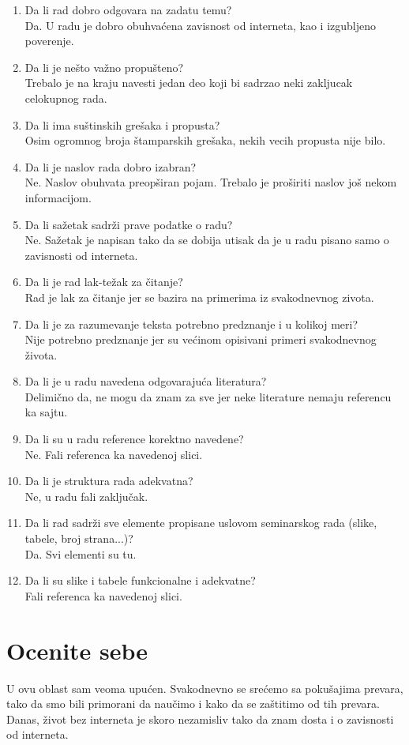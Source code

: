 \documentclass[a4paper]{report}
\begin{document}
\begin{enumerate}
\item Da li rad dobro odgovara na zadatu temu?\\
Da. U radu je dobro obuhvaćena zavisnost od interneta, kao i izgubljeno poverenje.
\item Da li je nešto važno propušteno?\\
Trebalo je na kraju navesti jedan deo koji bi sadrzao neki zakljucak celokupnog rada.
\item Da li ima suštinskih grešaka i propusta?\\
Osim ogromnog broja štamparskih grešaka, nekih vecih propusta nije bilo.
\item Da li je naslov rada dobro izabran?\\
Ne. Naslov obuhvata preopširan pojam. Trebalo je proširiti naslov još nekom informacijom. 
\item Da li sažetak sadrži prave podatke o radu?\\
Ne. Sažetak je napisan tako da se dobija utisak da je u radu pisano samo o zavisnosti od interneta.
\item Da li je rad lak-težak za čitanje?\\
Rad je lak za čitanje jer se bazira na primerima iz svakodnevnog zivota.
\item Da li je za razumevanje teksta potrebno predznanje i u kolikoj meri?\\
Nije potrebno predznanje jer su većinom opisivani primeri svakodnevnog života.
\item Da li je u radu navedena odgovarajuća literatura?\\
Delimično da, ne mogu da znam za sve jer neke literature nemaju referencu ka sajtu.
\item Da li su u radu reference korektno navedene?\\
Ne. Fali referenca ka navedenoj slici.
\item Da li je struktura rada adekvatna?\\
Ne, u radu fali zaključak.
\item Da li rad sadrži sve elemente propisane uslovom seminarskog rada (slike, tabele, broj strana...)?\\
Da. Svi elementi su tu.
\item Da li su slike i tabele funkcionalne i adekvatne?\\
Fali referenca ka navedenoj slici.
\end{enumerate}

\section{Ocenite sebe}
U ovu oblast sam veoma upućen. Svakodnevno se srećemo sa pokušajima prevara, tako da smo bili primorani da naučimo i kako da se zaštitimo od tih prevara. Danas, život bez interneta je skoro nezamisliv tako da znam dosta i o zavisnosti od interneta.
\end{document}
